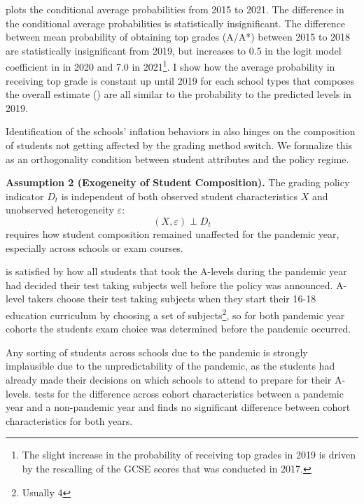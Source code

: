  plots the conditional average probabilities from 2015 to 2021. The difference in the conditional average probabilities is statistically insignificant. The difference between mean probability of obtaining top grades (A/A*) between 2015 to 2018 are statistically insignificant from 2019, but increases to 0.5 in the logit model coefficient in in 2020 and 7.0 in 2021\footnote{The slight increase in the probability of receiving top grades in 2019 is driven by the rescalling of the GCSE scores that was conducted in 2017.}. I show how the average probability in receiving top grade is constant up until 2019 for each school types that composes the overall estimate () are all similar to the probability to the predicted levels in 2019.  

Identification of the schools' inflation behaviors in  also hinges on the composition of students not getting affected by the grading method switch. We formalize this as an orthogonality condition between student attributes and the policy regime.

\vspace{0.5em}

\noindent \textbf{Assumption 2 (Exogeneity of Student Composition).} The grading policy indicator $D_t$ is independent of both observed student characteristics $X$ and unobserved heterogeneity $\varepsilon$:
\begin{equation}
\label{eq:composition}
    (X, \varepsilon) \perp D_{t}
\end{equation}
\noindent {} requires how student composition remained unaffected for the pandemic year, especially across schools or exam courses. 

 is satisfied by how all students that took the A-levels during the pandemic year had decided their test taking subjects well before the policy was announced. A-level takers choose their test taking subjects when they start their 16-18 education curriculum by choosing a set of subjects\footnote{Usually 4}, so for both pandemic year cohorts the students exam choice was determined before the pandemic occurred. 

Any sorting of students across schools due to the pandemic is strongly implausible due to the unpredictability of the pandemic, as the students had already made their decisions on which schools to attend to prepare for their A-levels.  tests for the difference across cohort characteristics between a pandemic year and a non-pandemic year and finds no significant difference between cohort characteristics for both years. 

